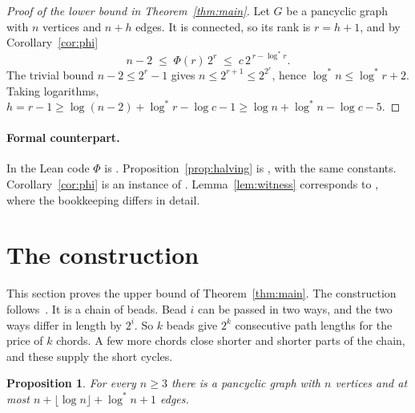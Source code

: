 \documentclass[11pt]{article}
\newtheorem{proposition}[theorem]{Proposition}
\theoremstyle{definition}
\theoremstyle{remark}
\newcommand{\lgs}{\log^{*}}
\begin{document}
\begin{proof}[Proof of the lower bound in Theorem~\ref{thm:main}]
Let $G$ be a pancyclic graph with $n$ vertices and $n+h$ edges. It is connected, so its rank is
$r=h+1$, and by Corollary~\ref{cor:phi}
\[
  n-2\;\le\;\Phi(r)\,2^{r}\;\le\;c\,2^{\,r-\lgs r}.
\]
The trivial bound $n-2\le2^{r}-1$ gives $n\le2^{r+1}\le2^{2^{r}}$, hence $\lgs n\le\lgs r+2$. Taking
logarithms, $h=r-1\ge\log(n-2)+\lgs r-\log c-1\ge\log n+\lgs n-\log c-5$.
\end{proof}

\paragraph{Formal counterpart.}
In the Lean code $\Phi$ is . Proposition~\ref{prop:halving} is
, with the same constants.
Corollary~\ref{cor:phi} is an instance of . Lemma~\ref{lem:witness}
corresponds to , where the bookkeeping differs in detail.
\section{The construction}\label{sec:upper}

This section proves the upper bound of Theorem~\ref{thm:main}. The construction follows~\cite{KNT}.
It is a chain of beads. Bead $i$ can be passed in two ways, and the two ways differ in length by
$2^{i}$. So $k$ beads give $2^{k}$ consecutive path lengths for the price of $k$ chords. A few more
chords close shorter and shorter parts of the chain, and these supply the short cycles.

\begin{proposition}\label{prop:upper}
For every $n\ge3$ there is a pancyclic graph with $n$ vertices and at most
$n+\lfloor\log n\rfloor+\lgs n+1$ edges.
\end{proposition}
\end{document}
